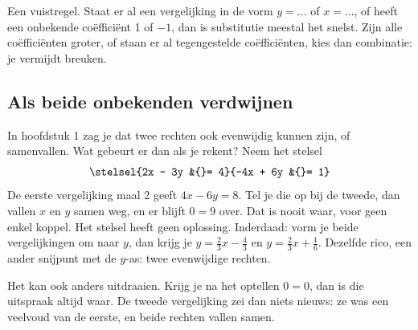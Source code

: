 Een vuistregel. Staat er al een vergelijking in de vorm $y = \ldots$ of $x = \ldots$, of heeft een onbekende coëfficiënt 1 of $-1$, dan is substitutie meestal het snelst. Zijn alle coëfficiënten groter, of staan er al tegengestelde coëfficiënten, kies dan combinatie: je vermijdt breuken.

\begin{oefeningen}
\end{oefeningen}

\subsection{Als beide onbekenden verdwijnen}

In hoofdstuk 1 zag je dat twee rechten ook evenwijdig kunnen zijn, of samenvallen. Wat gebeurt er dan als je rekent? Neem het stelsel
\[ \stelsel{2x - 3y &{}= 4}{-4x + 6y &{}= 1} \]
De eerste vergelijking maal 2 geeft $4x - 6y = 8$. Tel je die op bij de tweede, dan vallen $x$ en $y$ samen weg, en er blijft $0 = 9$ over. Dat is nooit waar, voor geen enkel koppel. Het stelsel heeft geen oplossing. Inderdaad: vorm je beide vergelijkingen om naar $y$, dan krijg je $y = \tfrac23 x - \tfrac43$ en $y = \tfrac23 x + \tfrac16$. Dezelfde rico, een ander snijpunt met de $y$-as: twee evenwijdige rechten.


Het kan ook anders uitdraaien. Krijg je na het optellen $0 = 0$, dan is die uitspraak altijd waar. De tweede vergelijking zei dan niets nieuws: ze was een veelvoud van de eerste, en beide rechten vallen samen.


